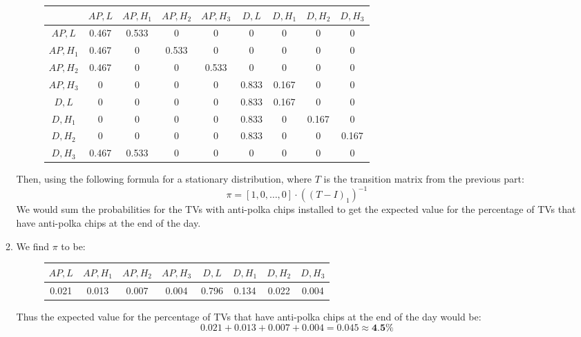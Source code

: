 \documentclass{article}
\begin{document}
\begin{enumerate}[start=0]
\begin{enumerate}
    \begin{figure}[H]
    \centering
    \begin{tabular}{|c||c|c|c|c|c|c|c|c|}
    \hline
    & $AP,L$ & $AP,H_1$ & $AP,H_2$ & $AP,H_3$ & $D,L$ & $D,H_1$ & $D,H_2$ &
    $D,H_3$ \\\hline\hline
    $AP,L$   & 0.467 & 0.533 & 0 & 0 & 0 & 0 & 0 & 0\\\hline
    $AP,H_1$ & 0.467 & 0 & 0.533 & 0 & 0 & 0 & 0 & 0\\\hline
    $AP,H_2$ & 0.467 & 0 & 0 & 0.533 & 0 & 0 & 0 & 0\\\hline
    $AP,H_3$ & 0 & 0 & 0 & 0 & 0.833 & 0.167 & 0 & 0\\\hline
    $D,L$    & 0 & 0 & 0 & 0 & 0.833 & 0.167 & 0 & 0\\\hline
    $D,H_1$  & 0 & 0 & 0 & 0 & 0.833 & 0 & 0.167 & 0\\\hline
    $D,H_2$  & 0 & 0 & 0 & 0 & 0.833 & 0 & 0 & 0.167\\\hline
    $D,H_3$  & 0.467 & 0.533 & 0 & 0 & 0 & 0 & 0 & 0\\\hline
    \end{tabular}
    \end{figure}
    Then, using the following formula for a stationary distribution, where $T$
    is the transition matrix from the previous part:
    $$ \pi = [1,0,\ldots,0]\cdot ((T-I)_1)^{-1} $$
    We would sum the probabilities for the TVs with anti-polka chips installed
    to get the expected value for the percentage of TVs that have anti-polka
    chips at the end of the day.
    \item{}
    We find $\pi$ to be:
    \begin{figure}[H]
    \centering
    \begin{tabular}{|c|c|c|c|c|c|c|c|}
    \hline
    $AP,L$ & $AP,H_1$ & $AP,H_2$ & $AP,H_3$ & $D,L$ & $D,H_1$ & $D,H_2$ &
    $D,H_3$ \\\hline\hline
    0.021 & 0.013 & 0.007 & 0.004 & 0.796 & 0.134 & 0.022 &  0.004\\\hline
    \end{tabular}
    \end{figure}
    Thus the expected value for the percentage of TVs that have anti-polka chips
    at the end of the day would be:
    $$ 0.021 + 0.013 + 0.007 + 0.004 = 0.045 \approx \textbf{4.5\%} $$
\end{enumerate}
\end{enumerate}
\end{document}

